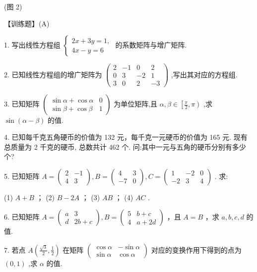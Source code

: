 \documentclass[10pt]{article}
\begin{document}
(图 2)

【训练题】(A)

1. 写出线性方程组 \(\left\{  \begin{array}{l} {2x} + {3y} = 1, \\  {4x} - y = 6 \end{array}\right.\) 的系数矩阵与增广矩阵.

2. 已知线性方程组的增广矩阵为 \(\left( \begin{matrix} 2 &  - 1 & 0 & 2 \\  0 & 3 &  - 2 & 1 \\  3 & 0 & 2 &  - 3 \end{matrix}\right)\) ,写出其对应的方程组.

3. 已知矩阵 \(\left( \begin{array}{ll} \sin \alpha  + \cos \alpha & 0 \\  \sin \beta  + \cos \beta & 1 \end{array}\right)\) 为单位矩阵,且 \(\alpha ,\beta  \in  \left\lbrack  {\frac{\pi }{2},\pi }\right)\) ,求 \(\sin \left( {\alpha  - \beta }\right)\) 的值.

4. 已知每千克五角硬币的价值为 132 元，每千克一元硬币的价值为 165 元. 现有总质量为 2 千克的硬币, 总数共计 462 个. 问:其中一元与五角的硬币分别有多少个?

5. 已知矩阵 \(A = \left( \begin{matrix} 2 &  - 1 \\  4 & 3 \end{matrix}\right) ,B = \left( \begin{matrix} 4 & 3 \\   - 7 & 0 \end{matrix}\right) ,C = \left( \begin{matrix} 1 &  - 2 & 0 \\   - 2 & 3 & 4 \end{matrix}\right)\) . 求:

(1) \(A + B\) ； (2) \(B - {2A}\) ； (3) \({AB}\) ； (4) \({AC}\) .

6. 已知矩阵 \(A = \left( \begin{matrix} a & 3 \\  d & {2b} + c \end{matrix}\right) ,B = \left( \begin{matrix} 5 & b + c \\  4 & a + {2d} \end{matrix}\right)\) ，且 \(A = B\) ，求 \(a,b,c,d\) 的值.

7. 若点 \(A\left( {\frac{\sqrt{3}}{2},\frac{1}{2}}\right)\) 在矩阵 \(\left( \begin{array}{rr} \cos \alpha &  - \sin \alpha \\  \sin \alpha & \cos \alpha  \end{array}\right)\) 对应的变换作用下得到的点为 \(\left( {0,1}\right)\) ,求 \(\alpha\) 的值.
\end{document}
